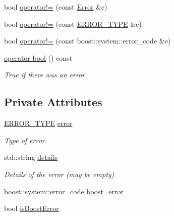 \begin{DoxyCompactItemize}
bool \hyperlink{group___syntactic_sugar_ga43ee206eb49d8427e6c85ed7a4e2f62d}{operator!=} (const \hyperlink{classshaan97_1_1sync_1_1_error}{Error} \&e)
\item 
bool \hyperlink{group___syntactic_sugar_ga93d2c3b440e64d2c2e5385989af96d16}{operator!=} (const \hyperlink{namespaceshaan97_1_1sync_a69f4d5572314be52626f6a1c8ecc8db9}{E\+R\+R\+O\+R\+\_\+\+T\+Y\+PE} \&e)
\item 
bool \hyperlink{group___syntactic_sugar_ga67831fc5e4cef9661a5158acdb33da25}{operator!=} (const boost\+::system\+::error\+\_\+code \&e)
\item 
\hyperlink{group___syntactic_sugar_gaba6a2a8da1a2771f4a007020eb27b256}{operator bool} () const
\begin{DoxyCompactList}\small\item\em True if there was an error. \end{DoxyCompactList}\end{DoxyCompactItemize}
\subsection*{Private Attributes}
\begin{DoxyCompactItemize}
\item 
\hyperlink{namespaceshaan97_1_1sync_a69f4d5572314be52626f6a1c8ecc8db9}{E\+R\+R\+O\+R\+\_\+\+T\+Y\+PE} \hyperlink{classshaan97_1_1sync_1_1_error_ab84e9af061261009996c1297c5cad5bd}{error}
\begin{DoxyCompactList}\small\item\em Type of error. \end{DoxyCompactList}\item 
std\+::string \hyperlink{classshaan97_1_1sync_1_1_error_a92edb57631c4d7a2f0177f3440111b23}{details}
\begin{DoxyCompactList}\small\item\em Details of the error (may be empty) \end{DoxyCompactList}\item 
boost\+::system\+::error\+\_\+code \hyperlink{classshaan97_1_1sync_1_1_error_ac5664dc7101fda44de7145dbf17a0923}{boost\+\_\+error}
\item 
bool \hyperlink{classshaan97_1_1sync_1_1_error_afc11f4b04e46329a1317d157d4d92771}{is\+Boost\+Error}
\end{DoxyCompactItemize}
